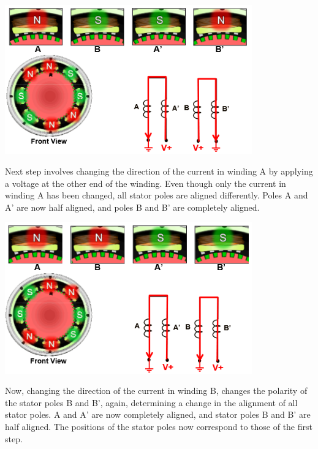 \begin{center}
	\includegraphics[width=0.8\textwidth]{figures/move/motor33}
	\label{fig:hybrid_second_step}
\end{center}

Next step involves changing the direction of the current in winding A by applying a voltage at the 
other end of the winding. Even though only the current in winding A has been changed, all stator 
poles are aligned differently. Poles A and A’ are now half aligned, and poles B and B’ are 
completely aligned.

\begin{center}
	\includegraphics[width=0.8\textwidth]{figures/move/motor34}
	\label{fig:hybrid_third_step}
\end{center}

Now, changing the direction of the current in winding B, changes the polarity of the stator poles B 
and B', again, determining a change in the alignment of all stator poles. A and A’ are now 
completely aligned, and stator poles B and B’ are half aligned. The positions of the stator poles 
now correspond to those of the first step.


